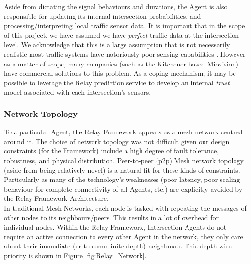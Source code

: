 \documentclass{article}
\begin{document}
Aside from dictating the signal behaviours and durations, the Agent is also responsible for updating its internal intersection probabilities, and processing/interpreting local traffic sensor data.
It is important that in the scope of this project, we have assumed we have \emph{perfect} traffic data at the intersection level.
We acknowledge that this is a large assumption that is not necessarily realistic most traffic systems have notoriously poor sensing capabilities \cite{Miovision:2012}.
However as a matter of scope, many companies (such as the Kitchener-based Miovision) have commercial solutions to this problem.
As a coping mechanism, it may be possible to leverage the Relay prediction service to develop an internal \emph{trust} model associated with each intersection's sensors.\\

\subsubsection{Network Topology}

To a particular Agent, the Relay Framework appears as a mesh network centred around it.
The choice of network topology was not difficult given our design constraints (for the Framework) include a high degree of fault tolerance, robustness, and physical distribution.
Peer-to-peer (p2p) Mesh network topology (aside from being relatively novel) is a natural fit for these kinds of constraints.
Particularly as many of the technology's weaknesses (poor latency, poor scaling behaviour for complete connectivity of all Agents, etc.) are explicitly avoided by the Relay Framework Architecture.\\

In traditional Mesh Networks, each node is tasked with repeating the messages of other nodes to its neighbours/peers.
This results in a lot of overhead for individual nodes.
Within the Relay Framework, Intersection Agents do not require an active connection to every other Agent in the network, they only care about their immediate (or to some finite-depth) neighbours.
This depth-wise priority is shown in Figure \ref{fig:Relay_Network}.\\
\end{document}
